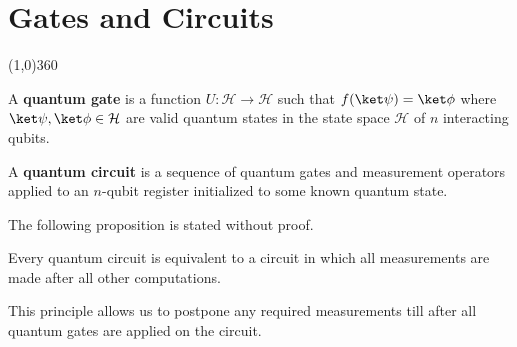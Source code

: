 \chapter{Gates and Circuits}
\line(1,0){360} \\

\begin{comment}
     x Definitition of quantum gates
     x reversible defn
     x quantum circuit definition
     x deferred measurement principle
     x Representation of a quantum gate in dirac notation
     x gate which takes \ket\psi to \ket\phi
     x ket bra notation and how it describes a transformation
     x any reversible classical gate has a valid quantum analog
     * Single Qubit Gates
     * Eigen values and Eigenvectors of Hadamard Gate
     * Multiple Qubit Gates
     * Quantum Gates applied to one qubit in an $n$-qubit register
\end{comment}


\begin{defn}
    A \textbf{quantum gate} is a function $U: \mathcal{H} \to \mathcal{H}$ such that $f(\ket\psi) = \ket\phi$ where $\ket\psi, \ket\phi \in \mathcal{H}$ are valid quantum states in the state space $\mathcal{H}$ of $n$ interacting qubits.
\end{defn}

\begin{defn}
    A \textbf{quantum circuit} is a sequence of quantum gates and measurement operators applied to an $n$-qubit register initialized to some known quantum state.
\end{defn}

The following proposition is stated without proof. 

\begin{prop}
    Every quantum circuit is equivalent to a circuit in which all measurements are made after all other computations.
\end{prop}

This principle allows us to postpone any required measurements till after all quantum gates are applied on the circuit.

